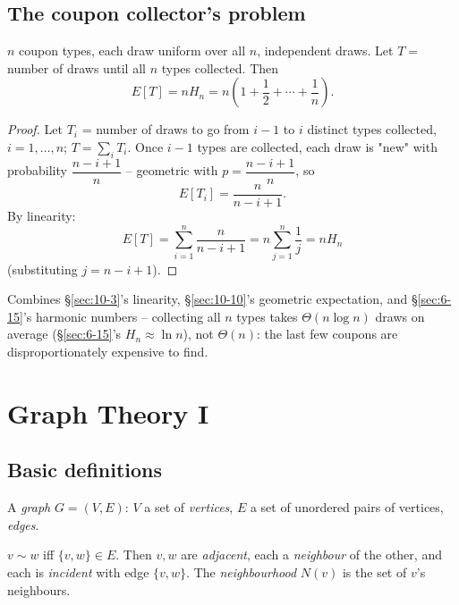 \documentclass[11pt]{article}
\begin{document}
\subsection{The coupon collector's problem}
\label{sec:10-11}

\begin{theorem}
$n$ coupon types, each draw uniform over all $n$, independent draws. Let $T=$ number of draws until all $n$ types collected. Then
\[
E[T] = n H_n = n\left(1+\frac12+\cdots+\frac1n\right).
\]
\end{theorem}
\begin{proof}
Let $T_i$ = number of draws to go from $i-1$ to $i$ distinct types collected, $i=1,\dots,n$; $T=\sum_i T_i$. Once $i-1$ types are collected, each draw is "new" with probability $\dfrac{n-i+1}{n}$ -- geometric with $p=\dfrac{n-i+1}{n}$, so
\[
E[T_i] = \frac{n}{n-i+1}.
\]
By linearity:
\[
E[T] = \sum_{i=1}^n \frac{n}{n-i+1} = n\sum_{j=1}^n\frac1j = nH_n
\]
(substituting $j=n-i+1$).
\end{proof}

\begin{note}
Combines \S\ref{sec:10-3}'s linearity, \S\ref{sec:10-10}'s geometric expectation, and \S\ref{sec:6-15}'s harmonic numbers -- collecting all $n$ types takes $\Theta(n\log n)$ draws on average (\S\ref{sec:6-15}'s $H_n\approx\ln n$), not $\Theta(n)$: the last few coupons are disproportionately expensive to find.
\end{note}

\newpage
\section{Graph Theory I}

\subsection{Basic definitions}
\label{sec:11-1}

\begin{definition}[Graph]
A \emph{graph} $G=(V,E)$: $V$ a set of \emph{vertices}, $E$ a set of unordered pairs of vertices, \emph{edges}.
\end{definition}

\begin{definition}
$v\sim w$ iff $\{v,w\}\in E$. Then $v,w$ are \emph{adjacent}, each a \emph{neighbour} of the other, and each is \emph{incident} with edge $\{v,w\}$. The \emph{neighbourhood} $N(v)$ is the set of $v$'s neighbours.
\end{definition}
\end{document}
